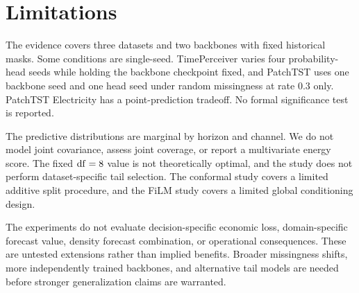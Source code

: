 \section{Limitations}
\label{sec:limitations}

The evidence covers three datasets and two backbones with fixed historical masks. Some conditions are single-seed. TimePerceiver varies four probability-head seeds while holding the backbone checkpoint fixed, and PatchTST uses one backbone seed and one head seed under random missingness at rate $0.3$ only. PatchTST Electricity has a point-prediction tradeoff. No formal significance test is reported.

The predictive distributions are marginal by horizon and channel. We do not model joint covariance, assess joint coverage, or report a multivariate energy score. The fixed $\mathrm{df}=8$ value is not theoretically optimal, and the study does not perform dataset-specific tail selection. The conformal study covers a limited additive split procedure, and the FiLM study covers a limited global conditioning design.

The experiments do not evaluate decision-specific economic loss, domain-specific forecast value, density forecast combination, or operational consequences. These are untested extensions rather than implied benefits. Broader missingness shifts, more independently trained backbones, and alternative tail models are needed before stronger generalization claims are warranted.
